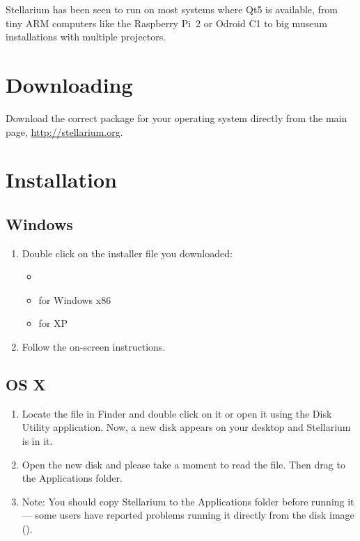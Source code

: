 Stellarium has been seen to run on most systems where Qt5 is
available, from tiny ARM computers like the Raspberry Pi~2 or Odroid
C1 to big museum installations with multiple projectors.

\section{Downloading}
\label{sec:GettingStarted:Downloading}

Download the correct package for your operating system directly from the main page,
\url{http://stellarium.org}.

\section{Installation}
\label{sec:GettingStarted:Installation}

\subsection{Windows}

\begin{enumerate}
\item Double click on the installer file you downloaded:
\begin{itemize}
\item {}
\item {} for Windows x86
\item {} for XP
\end{itemize}
\item Follow the on-screen instructions.
\end{enumerate}

\subsection{OS X}

\begin{enumerate}
\item
  Locate the  file in
  Finder and double click on it or open it using the Disk Utility
  application. Now, a new disk appears on your desktop and Stellarium is
  in it.
\item
  Open the new disk and please take a moment to read the  file.
  Then drag  to the Applications folder.
\item
  Note: You should copy Stellarium to the Applications folder before
  running it --- some users have reported problems running it directly
  from the disk image ().
\end{enumerate}

